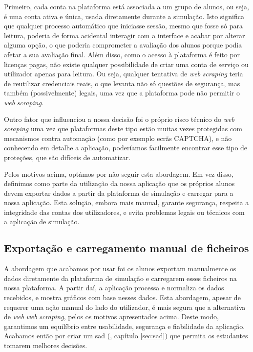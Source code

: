 Primeiro, cada conta na plataforma está associada a um grupo de alunos, ou seja, é uma conta ativa e única, usada diretamente durante a simulação. Isto significa que qualquer processo automático que iniciasse sessão, mesmo que fosse só para leitura, poderia de forma acidental interagir com a interface e acabar por alterar alguma opção, o que poderia comprometer a avaliação dos alunos porque podia afetar a sua avaliação final. Além disso, como o acesso à plataforma é feito por licenças pagas, não existe qualquer possibilidade de criar uma conta de serviço ou utilizador apenas para leitura. Ou seja, qualquer tentativa de \textit{web} \textit{scraping} teria de reutilizar credenciais reais, o que levanta não só questões de segurança, mas também (possivelmente) legais, uma vez que a plataforma pode não permitir o \textit{web} \textit{scraping}.

Outro fator que influenciou a nossa decisão foi o próprio risco técnico do \textit{web} \textit{scraping} uma vez que plataformas deste tipo estão muitas vezes protegidas com mecanismos contra automação (como por exemplo ecrãs CAPTCHA), e não conhecendo em detalhe a aplicação, poderíamos facilmente encontrar esse tipo de proteções, que são difíceis de automatizar.

Pelos motivos acima, optámos por não seguir esta abordagem. Em vez disso, definimos como parte da utilização da nossa aplicação que os próprios alunos devem exportar dados a partir da plataforma de simulação e carregar para a nossa aplicação. Esta solução, embora mais manual, garante segurança, respeita a integridade das contas dos utilizadores, e evita problemas legais ou técnicos com a aplicação de simulação.

\subsection{Exportação e carregamento manual de ficheiros}

A abordagem que acabamos por usar foi os alunos exportam manualmente os dados diretamente da plataforma de simulação e carregarem esses ficheiros na nossa plataforma. A partir daí, a aplicação processa e normaliza os dados recebidos, e mostra gráficos com base nesses dados. Esta abordagem, apesar de requerer uma ação manual do lado do utilizador, é mais segura que a alternativa de \textit{web} \textit{web} \textit{scraping}, pelos os motivos apresentados acima. Deste modo, garantimos um equilíbrio entre usabilidade, segurança e fiabilidade da aplicação. Acabamos então por criar um \gls{sad} (\cf, capítulo \ref{sec:sad}) que permita os estudantes tomarem melhores decisões.

